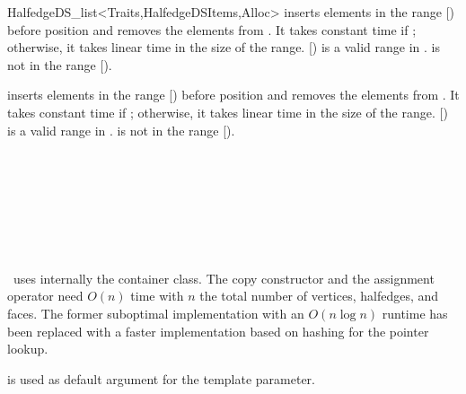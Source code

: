 \begin{ccRefClass}{HalfedgeDS_list<Traits,HalfedgeDSItems,Alloc>}
    {inserts elements in the range [) before position 
      and removes the elements from . It takes 
     constant time if \ccVar; otherwise, it takes linear
     time in the size of the range. \ccPrecond [) is a
     valid range in .  is not in the range
     [).}

    {\XHDS inserts elements in the range [) before position 
      and removes the elements from . It takes 
     constant time if \ccVar; otherwise, it takes linear
     time in the size of the range. \ccPrecond [) is a
     valid range in .  is not in the range
     [).}


\ccSeeAlso

\\
\\
\\
\\
\\
\\


\ccImplementation

\ccRefName\ uses internally the  container class.
The copy constructor and the assignment operator need $O(n)$ time with
$n$ the total number of vertices, halfedges, and faces. The former 
suboptimal implementation with an $O(n \log n)$ runtime has been replaced
with a faster implementation based on hashing for the pointer lookup.

 is used as default argument for the
 template parameter.  

\end{ccRefClass} %

\ccRefPageEnd
